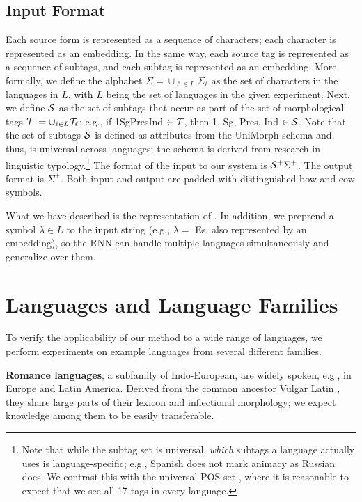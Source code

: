 \documentclass[11pt,letterpaper]{article}
\newcommand{\mtag}[1]{{\small{\textsf{#1}}}}
\begin{document}
\subsection{Input Format}
Each source form is represented as a sequence of characters; each
character is represented as an embedding.  In the same way, each
source tag is represented as a sequence of subtags, and each subtag is
represented as an embedding. More formally, we define the alphabet
$\Sigma = \cup_{\ell \in L} \Sigma_\ell$ as the set of characters in
the languages in $L$, with $L$ being the set of languages in the given
experiment. Next, we define ${\cal S}$ as the set of subtags that
occur as part of the set of morphological tags $\cal{T}$ $= \cup_{\ell
  \in L} \cal{T}_\ell$; e.g., if \mtag{1\-Sg\-Pres\-Ind} $\in
\cal{T}$, then \mtag{1}, \mtag{Sg}, \mtag{Pres}, \mtag{Ind} $\in
    {\cal S}$. Note that the set of subtags ${\cal S}$ is defined as
    attributes from the {\sc UniMorph} schema \cite{unimorph} and,
    thus, is universal across languages; the schema is derived from
    research in linguistic typology.\footnote{Note that while the
      subtag set is universal, {\em which} subtags a language actually
      uses is language-specific; e.g., Spanish does not mark animacy as Russian
      does. We contrast this with the universal POS set
      \cite{petrov2011universal}, where it is reasonable to expect
      that we see all 17 tags in every language.} The format of the
    input to our system is ${\cal S}^+ \Sigma^+$.  The output format
    is $\Sigma^+$. Both input and output are padded with distinguished
    {\sc bow} and {\sc eow} symbols.

What we have described is  the representation of
.  In addition, we preprend a symbol $\lambda \in
L$ to the input string (e.g., $\lambda=$ \mtag{Es}, also represented
by an embedding), so the RNN can handle multiple languages
simultaneously and generalize over them.


\section{Languages and Language Families}
To verify the applicability of our method to a wide range of languages,
we perform experiments on example languages from several different families.

\textbf{Romance languages}, a subfamily of 
Indo-European, are widely spoken, e.g., in
Europe and Latin America. 
Derived from the common ancestor
Vulgar Latin \cite{harris2003romance}, they share
large parts of their lexicon and inflectional morphology; we
expect knowledge among them to be easily transferable.
\end{document}
